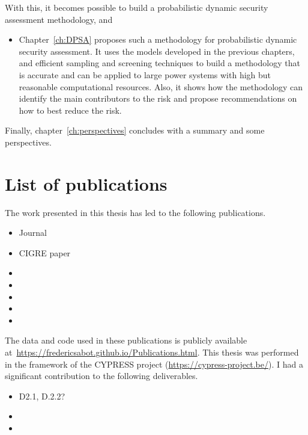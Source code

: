 With this, it becomes possible to build a probabilistic dynamic security assessment methodology, and

\begin{itemize}
    \item Chapter~\ref{ch:DPSA} proposes such a methodology for probabilistic dynamic security assessment. It uses the models developed in the previous chapters, and efficient sampling and screening techniques to build a methodology that is accurate and can be applied to large power systems with high but reasonable computational resources. Also, it shows how the methodology can identify the main contributors to the risk and propose recommendations on how to best reduce the risk.
\end{itemize}

Finally, chapter~\ref{ch:perspectives} concludes with a summary and some perspectives.

\section{List of publications}

The work presented in this thesis has led to the following publications.

\begin{itemize}
    \item Journal
    \item CIGRE paper
    \item {}
    \item {}
    \item {}
    \item {}
    \item {}
\end{itemize}

The data and code used in these publications is publicly available at~\url{https://fredericsabot.github.io/Publications.html}. This thesis was performed in the framework of the CYPRESS project (\url{https://cypress-project.be/}). I had a significant contribution to the following deliverables.

\begin{itemize}
    \item D2.1, D.2.2?
    \item {}
    \item {}
\end{itemize}
